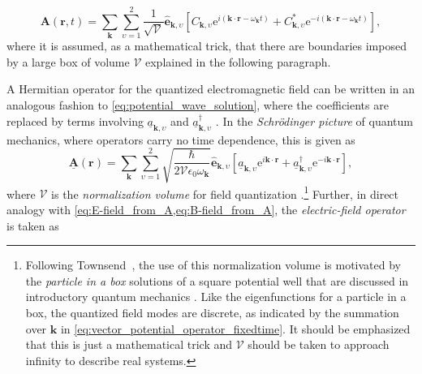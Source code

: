 \begin{equation}\label{eq:potential_wave_solution}
 \mathbold{A} ( \mathbold{r} , t) = \sum_{\mathbold{k}} \sum_{\upsilon = 1}^2 \frac{1}{\sqrt{\mathcal{V}}} \hat{\mathbold{e}}_{\mathbold{k},\upsilon} \left[ C_{\mathbold{k},\upsilon} \mathrm{e}^{i (\mathbold{k} \cdot \mathbold{r} - \omega_{\mathbold{k}} t)} + C^*_{\mathbold{k},\upsilon} \mathrm{e}^{-i (\mathbold{k} \cdot \mathbold{r} - \omega_{\mathbold{k}} t)} \right] , 
 \end{equation}
where it is assumed, as a mathematical trick, that there are boundaries imposed by a large box of volume $\mathcal{V}$ explained in the following paragraph. 

A Hermitian operator for the quantized electromagnetic field can be written in an analogous fashion to \cref{eq:potential_wave_solution}, where the coefficients are replaced by terms involving $\underline{a}_{\mathbold{k},\upsilon}$ and $\underline{a}^{\dagger}_{\mathbold{k},\upsilon}$ \cite{Townsend00}. %
In the \emph{Schr\"odinger picture} of quantum mechanics, where operators carry no time dependence, this is given as \cite{Shankar04,Townsend00} 
\begin{equation}
 \underline{\mathbold{A}} ( \mathbold{r} ) = \sum_{\mathbold{k}} \sum_{\upsilon = 1}^2  \sqrt{\frac{\hbar}{2 \mathcal{V} \epsilon_0 \omega_{\mathbold{k}}}} \hat{\mathbold{e}}_{\mathbold{k},\upsilon} \left[ \underline{a}_{\mathbold{k},\upsilon} \mathrm{e}^{i \mathbold{k} \cdot \mathbold{r} } + \underline{a}^{\dagger}_{\mathbold{k},\upsilon} \mathrm{e}^{-i \mathbold{k} \cdot \mathbold{r} } \right] , \label{eq:vector_potential_operator_fixedtime} %
 \end{equation}
where $\mathcal{V}$ is the \emph{normalization volume} for field quantization \cite[\emph{cf.\@} \cref{eq:potential_wave_solution}]{Townsend00,kapitell4,wysin2011quantization}.\footnote{Following Townsend~\cite{Townsend00}, the use of this normalization volume is motivated by the \emph{particle in a box} solutions of a square potential well that are discussed in introductory quantum mechanics \cite{Griffiths05}. Like the eigenfunctions for a particle in a box, the quantized field modes are discrete, as indicated by the summation over $\mathbold{k}$ in \cref{eq:vector_potential_operator_fixedtime}. It should be emphasized that this is just a mathematical trick and $\mathcal{V}$ should be taken to approach infinity to describe real systems.\label{footnote:normalization_volume}}
Further, in direct analogy with \cref{eq:E-field_from_A,eq:B-field_from_A}, the \emph{electric-field operator} is taken as
